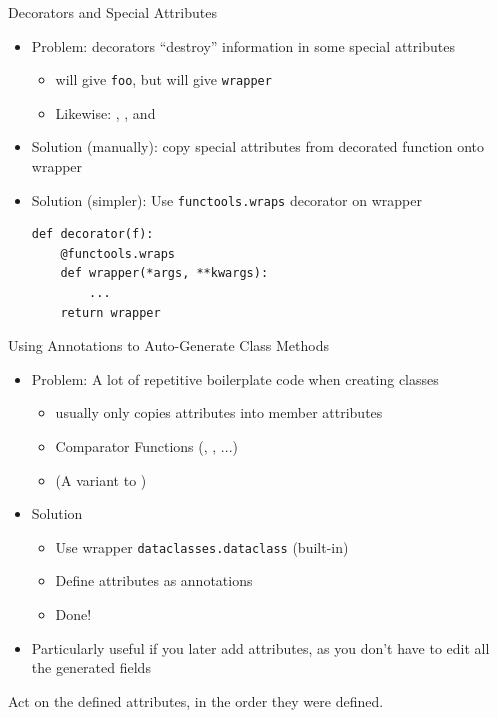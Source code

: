\begin{frame}[fragile]{Decorators and Special Attributes}
%
\begin{itemize}
\item Problem: decorators \enquote{destroy} information in some special attributes
	\begin{itemize}
	\item {} will give \texttt{foo}, but  will give \texttt{wrapper}
	\item Likewise: , ,  and 
	\end{itemize}
\item Solution (manually): copy special attributes from decorated function onto wrapper
\item Solution (simpler): Use \texttt{functools.wraps} decorator on wrapper
%
\begin{codebox}
\begin{verbatim}
def decorator(f):
    @functools.wraps
    def wrapper(*args, **kwargs):
        ...
    return wrapper
\end{verbatim}
\end{codebox}
\end{itemize}
%
\end{frame}


\begin{frame}{Using Annotations to Auto-Generate Class Methods}
%
\begin{itemize}
\item Problem: A lot of repetitive boilerplate code when creating classes
	\begin{itemize}
	\item {} usually only copies attributes into member attributes
	\item Comparator Functions (, , ...)
	\item {} (A variant to )
	\end{itemize}
\item Solution
	\begin{itemize}
	\item Use wrapper \texttt{dataclasses.dataclass} (built-in)
	\item Define attributes as annotations
	\item Done!
	\end{itemize}
\item Particularly useful if you later add attributes, as you don't have to edit all the generated fields
\end{itemize}
%
\begin{hintbox}
\footnotesize
Act on the defined attributes, in the order they were defined.
\end{hintbox}
%
\end{frame}

